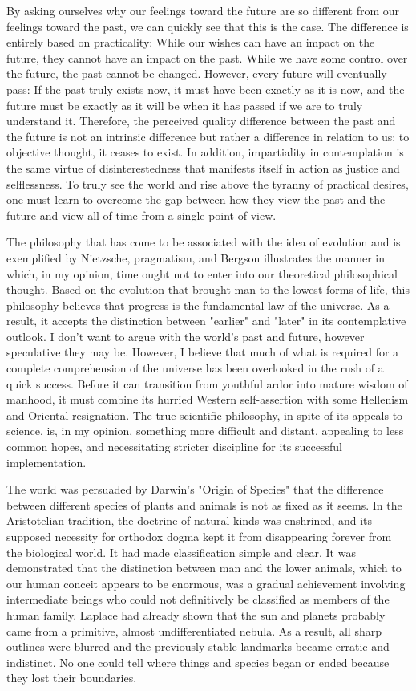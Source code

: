 \documentclass[a4paper,12pt]{book}[2004/02/16]
\theoremstyle{ilemma}
\theoremstyle{itheorem}
\theoremstyle{iother}
\theoremstyle{icorollary}
\theoremstyle{numcorollary}
\theoremstyle{idefinition}
\begin{document}
By asking ourselves why our feelings toward the future are so different from our feelings toward the past, we can quickly see that this is the case. The difference is entirely based on practicality: While our wishes can have an impact on the future, they cannot have an impact on the past. While we have some control over the future, the past cannot be changed. However, every future will eventually pass: If the past truly exists now, it must have been exactly as it is now, and the future must be exactly as it will be when it has passed if we are to truly understand it. Therefore, the perceived quality difference between the past and the future is not an intrinsic difference but rather a difference in relation to us: to objective thought, it ceases to exist. In addition, impartiality in contemplation is the same virtue of disinterestedness that manifests itself in action as justice and selflessness. To truly see the world and rise above the tyranny of practical desires, one must learn to overcome the gap between how they view the past and the future and view all of time from a single point of view.

The philosophy that has come to be associated with the idea of evolution and is exemplified by Nietzsche, pragmatism, and Bergson illustrates the manner in which, in my opinion, time ought not to enter into our theoretical philosophical thought. Based on the evolution that brought man to the lowest forms of life, this philosophy believes that progress is the fundamental law of the universe. As a result, it accepts the distinction between "earlier" and "later" in its contemplative outlook. I don't want to argue with the world's past and future, however speculative they may be. However, I believe that much of what is required for a complete comprehension of the universe has been overlooked in the rush of a quick success. Before it can transition from youthful ardor into mature wisdom of manhood, it must combine its hurried Western self-assertion with some Hellenism and Oriental resignation. The true scientific philosophy, in spite of its appeals to science, is, in my opinion, something more difficult and distant, appealing to less common hopes, and necessitating stricter discipline for its successful implementation.

The world was persuaded by Darwin's "Origin of Species" that the difference between different species of plants and animals is not as fixed as it seems. In the Aristotelian tradition, the doctrine of natural kinds was enshrined, and its supposed necessity for orthodox dogma kept it from disappearing forever from the biological world. It had made classification simple and clear. It was demonstrated that the distinction between man and the lower animals, which to our human conceit appears to be enormous, was a gradual achievement involving intermediate beings who could not definitively be classified as members of the human family. Laplace had already shown that the sun and planets probably came from a primitive, almost undifferentiated nebula. As a result, all sharp outlines were blurred and the previously stable landmarks became erratic and indistinct. No one could tell where things and species began or ended because they lost their boundaries.
\end{document}
